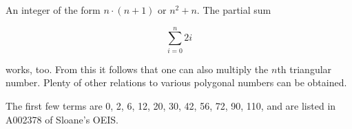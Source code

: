 \documentclass[12pt]{article}
\begin{document}
An integer of the form $n \cdot (n + 1)$ or $n^2 + n$. The partial sum

$$\sum_{i = 0}^n 2i$$

works, too. From this it follows that one can also multiply the $n$th triangular number. Plenty of other relations to various polygonal numbers can be obtained.

The first few terms are 0, 2, 6, 12, 20, 30, 42, 56, 72, 90, 110, and are listed in A002378 of Sloane's OEIS.
\end{document}
